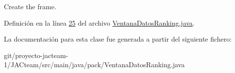 Create the frame. 

Definición en la línea \mbox{\hyperlink{_ventana_datos_ranking_8java_source_l00025}{25}} del archivo \mbox{\hyperlink{_ventana_datos_ranking_8java_source}{Ventana\+Datos\+Ranking.\+java}}.



La documentación para esta clase fue generada a partir del siguiente fichero\+:\begin{DoxyCompactItemize}
\item 
git/proyecto-\/jacteam-\/1/\+J\+A\+Cteam/src/main/java/pack/Ventana\+Datos\+Ranking.\+java\end{DoxyCompactItemize}
